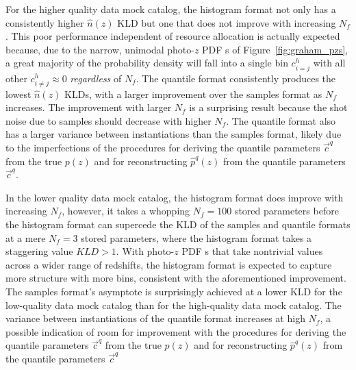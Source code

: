 \documentclass[\docopts]{\docclass}
\newcommand{\pz}{photo-$z$ PDF\xspace}
\begin{document}
For the higher quality data mock catalog, the histogram format not only has a 
consistently higher $\hat{n}(z)$ KLD but one that does not improve with 
increasing $N_{f}$.
This poor performance independent of resource allocation is actually expected 
because, due to the narrow, unimodal \pz s of Figure~\ref{fig:graham_pzs}, a 
great majority of the probability density will fall into a single bin 
$c^{h}_{i=j}$ with all other $c^{h}_{i\neq j}\approx 0$ \textit{regardless} of 
$N_{f}$.
The quantile format consistently produces the lowest $\hat{n}(z)$ KLDs, with a 
larger improvement over the samples format as $N_{f}$ increases.
The improvement with larger $N_{f}$ is a surprising result because the shot 
noise due to samples should decrease with higher $N_{f}$.
The quantile format also has a larger variance between instantiations than the 
samples format, likely due to the imperfections of the procedures for deriving 
the quantile parameters $\vec{c}^{q}$ from the true $p(z)$ and for 
reconstructing $\hat{p}^{q}(z)$ from the quantile parameters $\vec{c}^{q}$.

In the lower quality data mock catalog, the histogram format does improve with 
increasing $N_{f}$, however, it takes a whopping $N_{f}=100$ stored parameters 
before the histogram format can supercede the KLD of the samples and quantile 
formats at a mere $N_{f}=3$ stored parameters, where the histogram format takes 
a staggering value $KLD>1$.
With \pz s that take nontrivial values across a wider range of redshifts, the 
histogram format is expected to capture more structure with more bins, 
consistent with the aforementioned improvement.
The samples format's asymptote is surprisingly achieved at a lower KLD for the 
low-quality data mock catalog than for the high-quality data mock catalog.
The variance between instantiations of the quantile format increases at high 
$N_{f}$, a possible indication of room for improvement with the procedures for 
deriving the quantile parameters $\vec{c}^{q}$ from the true $p(z)$ and for 
reconstructing $\hat{p}^{q}(z)$ from the quantile parameters $\vec{c}^{q}$
\end{document}
